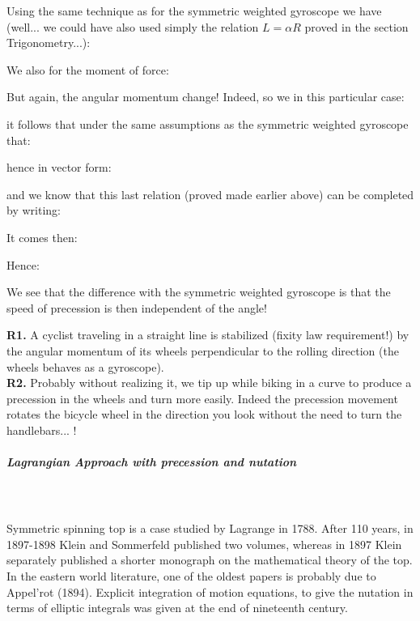 	Using the same technique as for the symmetric weighted gyroscope we have (well... we could have also used simply the relation $L=\alpha R$ proved in the section Trigonometry...):
	
	We also for the moment of force:
	
	But again, the angular momentum change! Indeed, so we in this particular case:
	
	it follows that under the same assumptions as the symmetric weighted gyroscope that:
	
	hence in vector form:
	
	and we know that this last relation (proved made earlier above) can be completed by writing:
	
	It comes then:
	
	Hence:
	
	We see that the difference with the symmetric weighted gyroscope is that the speed of precession is then independent of the angle!
	\begin{tcolorbox}[title=Remarks,colframe=black,arc=10pt]
	\textbf{R1.} A cyclist traveling in a straight line is stabilized (fixity law requirement!) by the angular momentum of its wheels perpendicular to the rolling direction (the wheels behaves as a gyroscope).\\
	
	\textbf{R2.} Probably without realizing it, we tip up while biking in a curve to produce a precession in the wheels and turn more easily. Indeed the precession movement rotates the bicycle wheel in the direction you look without the need to turn the handlebars... !
	\end{tcolorbox}
	
	\pagebreak
	\subparagraph{Lagrangian Approach with precession and nutation}\mbox{}\\\\
	Symmetric spinning top is a case studied by Lagrange in 1788. After 110 years, in 1897-1898 Klein and Sommerfeld published two volumes, whereas in 1897 Klein separately published a shorter monograph on the mathematical theory of the top. In the eastern world literature, one of the oldest papers is probably due to Appel’rot (1894). Explicit integration of motion equations, to give the nutation in terms of elliptic integrals was given at the end of nineteenth century. 

